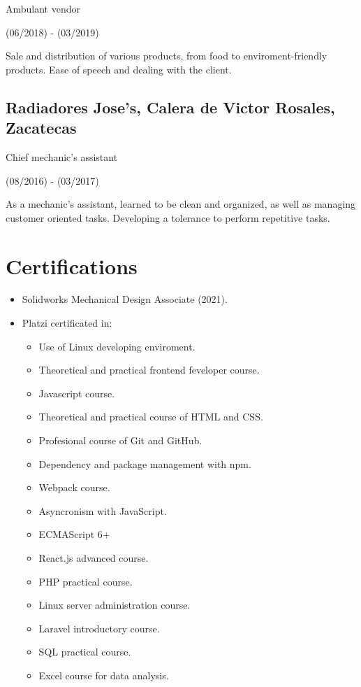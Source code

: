 \documentclass{scrartcl}
\begin{document}
  Ambulant vendor

  (06/2018) - (03/2019)

  Sale and distribution of various products, from food to enviroment-friendly products. Ease of speech and dealing with the client.

  \subsection{\textbf{Radiadores Jose's}, Calera de Victor Rosales, Zacatecas}

  Chief mechanic's assistant

  (08/2016) - (03/2017)

  As a mechanic's assistant, learned to be clean and organized, as well as managing customer oriented tasks. Developing a tolerance to perform repetitive tasks.


  \section{Certifications}

  \begin{itemize}
    \item Solidworks Mechanical Design Associate (2021).
    \item Platzi certificated in:
      \begin{itemize}
        \item Use of Linux developing enviroment.
        \item Theoretical and practical frontend feveloper course.
        \item Javascript course.
        \item Theoretical and practical course of HTML and CSS.
        \item Profesional course of Git and GitHub.
        \item Dependency and package management with npm.
        \item Webpack course.
        \item Asyncronism with JavaScript.
        \item ECMAScript 6+
        \item React.js advanced course.
        \item PHP practical course.
        \item Linux server administration course.
        \item Laravel introductory course.
        \item SQL practical course.
        \item Excel course for data analysis.
      \end{itemize}
  \end{itemize}
\end{document}
